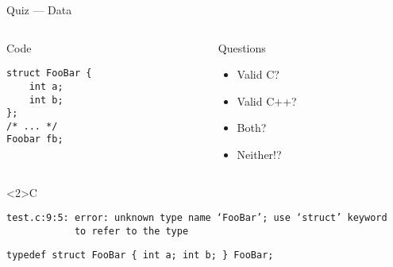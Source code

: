 \documentclass[presentation,aspectratio=169]{beamer}
\begin{document}
\begin{frame}[fragile,label={sec:org1921130}]{Quiz — Data}
\begin{columns}
\begin{column}{0.48\columnwidth}
\begin{block}{Code}
\begin{verbatim}
struct FooBar {
    int a;
    int b;
};
/* ... */
Foobar fb;
\end{verbatim}
\end{block}
\end{column}

\begin{column}{0.48\columnwidth}
\begin{block}{Questions}
\begin{itemize}
\item Valid C?
\item Valid C++?
\item Both?
\item Neither!?
\end{itemize}

\vspace{0.5cm}
\end{block}
\end{column}
\end{columns}
\begin{block}<2>{C}
\begin{verbatim}
test.c:9:5: error: unknown type name ‘FooBar’; use ‘struct’ keyword
            to refer to the type
\end{verbatim}

\begin{verbatim}
typedef struct FooBar { int a; int b; } FooBar;
\end{verbatim}
\end{block}
\end{frame}


\end{document}
